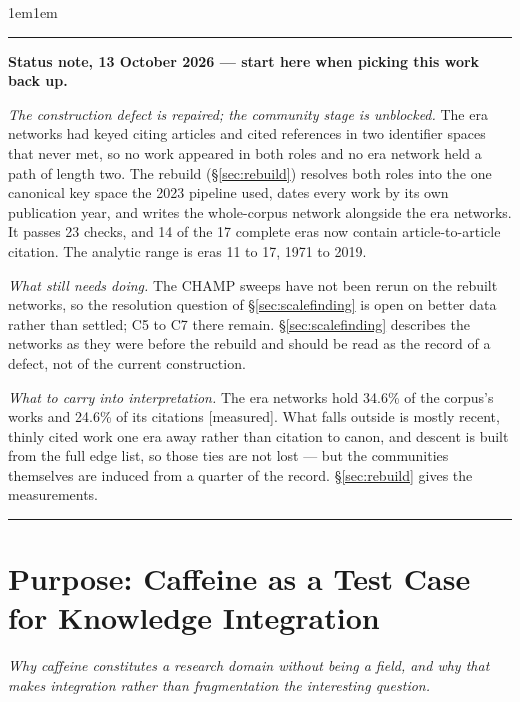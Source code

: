 \documentclass[11pt]{article}
\newcommand{\seccap}[1]{{\slshape\small #1\par}\vspace{0.8em}}
\newcommand{\meas}{{\footnotesize\textsf{[measured]}}}
\begin{document}
\vspace{1.5em}
\begin{adjustwidth}{1em}{1em}
\rule{\linewidth}{1.1pt}\par\vspace{0.4em}
\noindent\textbf{Status note, 13 October 2026 --- start here when picking this work back up.}
\par\vspace{0.3em}\small
\emph{The construction defect is repaired; the community stage is unblocked.} The era
networks had keyed citing articles and cited references in two identifier spaces that never
met, so no work appeared in both roles and no era network held a path of length two. The
rebuild (\S\ref{sec:rebuild}) resolves both roles into the one canonical key space the 2023
pipeline used, dates every work by its own publication year, and writes the whole-corpus
network alongside the era networks. It passes 23 checks, and 14 of the 17 complete eras now
contain article-to-article citation. The analytic range is eras 11 to 17, 1971 to 2019.

\emph{What still needs doing.} The CHAMP sweeps have not been rerun on the rebuilt networks,
so the resolution question of \S\ref{sec:scalefinding} is open on better data rather than
settled; C5 to C7 there remain. \S\ref{sec:scalefinding} describes the networks as they were
before the rebuild and should be read as the record of a defect, not of the current
construction.

\emph{What to carry into interpretation.} The era networks hold 34.6\% of the corpus's works
and 24.6\% of its citations \meas{}. What falls outside is mostly recent, thinly cited work
one era away rather than citation to canon, and descent is built from the full edge list, so
those ties are not lost --- but the communities themselves are induced from a quarter of the
record. \S\ref{sec:rebuild} gives the measurements.
\par\vspace{0.4em}\noindent\rule{\linewidth}{1.1pt}
\end{adjustwidth}

\vspace{1em}
\tableofcontents

\newpage

\section{Purpose: Caffeine as a Test Case for Knowledge Integration}
\label{sec:purpose}
\seccap{Why caffeine constitutes a research domain without being a field, and why that
makes integration rather than fragmentation the interesting question.}
\end{document}
